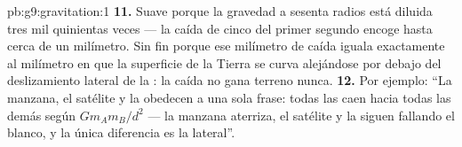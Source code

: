 \begin{solution}{pb:g9:gravitation:1}
\textbf{11.} Suave porque la gravedad a sesenta radios está diluida
tres mil quinientas veces --- la caída de cinco  del primer
segundo encoge hasta cerca de un milímetro. Sin fin porque ese
milímetro de caída iguala exactamente al milímetro en que la superficie
de la Tierra se curva alejándose por debajo del deslizamiento lateral
de la : la caída no gana terreno nunca.
\textbf{12.} Por ejemplo: ``La manzana, el satélite y la
 obedecen a una sola frase: todas las  caen
hacia todas las demás según $G m_A m_B / d^2$ --- la manzana aterriza,
el satélite y la  siguen fallando el blanco, y la única
diferencia es la  lateral''.
\end{solution}
